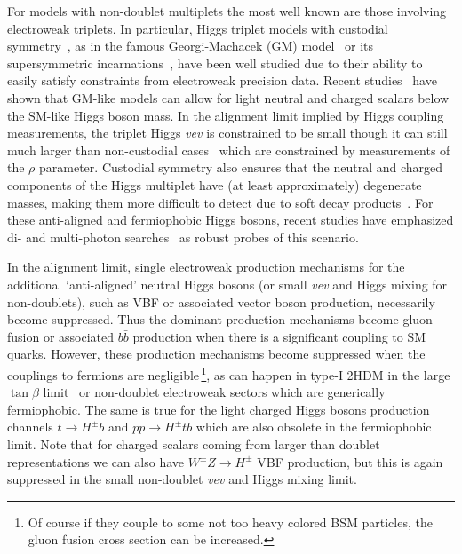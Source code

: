 \documentclass[../report.tex]{subfiles}
\begin{document}
For models with non-doublet multiplets the most well known are those involving electroweak triplets. In particular, Higgs triplet models with custodial symmetry~\cite{Sikivie:1980hm}, as in the famous Georgi-Machacek (GM) model~\cite{Georgi:1985nv,Chanowitz:1985ug,Gunion:1989ci,Gunion:1990dt,Hartling:2014zca} or its supersymmetric incarnations~\cite{Cort:2013foa,Garcia-Pepin:2014yfa,Vega:2017gkk}, have been well studied due to their ability to easily satisfy constraints from electroweak precision data. Recent studies~\cite{Davoudiasl:2004aj,Vega:2017gkk,Vega:2018ddp} have shown that GM-like models can allow for light neutral and charged scalars below the SM-like Higgs boson mass. In the alignment limit implied by Higgs coupling measurements, the triplet Higgs \emph{vev} is constrained to be small though it can still much larger than non-custodial cases~\cite{Tanabashi:2018oca,Haber:1999zh} which are constrained by measurements of the $\rho$ parameter. Custodial symmetry also ensures that the neutral and charged components of the Higgs multiplet have (at least approximately) degenerate masses, making them more difficult to detect due to soft decay products~\cite{Buckley:2009kv,Ismail:2016zby}. For these anti-aligned and fermiophobic Higgs bosons, recent studies have emphasized di- and multi-photon searches~\cite{Aaltonen:2016fnw,Delgado:2016arn,Brooijmans:2016vro,Vega:2018ddp} as robust probes of this scenario.

\label{sec:pheno}

In the alignment limit, single electroweak production mechanisms for the
additional `anti-aligned' neutral Higgs bosons (or small \emph{vev} and Higgs mixing for non-doublets), such as VBF or associated vector boson production, necessarily become suppressed. Thus the dominant production mechanisms become gluon fusion or associated $b\bar{b}$ production when there is a significant coupling to SM quarks. However, these production mechanisms become suppressed when the couplings to fermions are negligible\,\footnote{Of course if they couple to some not too heavy colored BSM particles, the gluon fusion cross section can be increased.}, as can happen in type-I 2HDM in the large $\tan\beta$ limit~\cite{Akeroyd:2003bt} or non-doublet electroweak sectors which are generically fermiophobic. The same is true for the light charged Higgs bosons production channels $t \to H^\pm b$ and $pp \to H^\pm t b$ which are also obsolete in the fermiophobic limit. Note that for charged scalars coming from larger than doublet representations we can also have $W^\pm Z \to H^\pm$ VBF production, but this is again suppressed in the small non-doublet \emph{vev} and Higgs mixing limit. 
\end{document}
